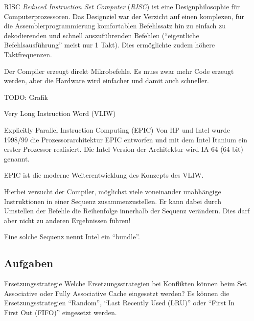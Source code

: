 \begin{defi}[Befehlssatzarchitektur]{RISC}
    \emph{Reduced Instruction Set Computer} (\emph{RISC}) ist eine Designphilosophie für Computerprozessoren.
    Das Designziel war der Verzicht auf einen komplexen, für die Assemblerprogrammierung komfortablen Befehlssatz hin zu einfach zu dekodierenden und schnell auszuführenden Befehlen (\enquote{eigentliche Befehlsausführung} meist nur 1 Takt).
    Dies ermöglichte zudem höhere Taktfrequenzen.

    Der Compiler erzeugt direkt Mikrobefehle.
    Es muss zwar mehr Code erzeugt werden, aber die Hardware wird einfacher und damit auch schneller.

    TODO: Grafik
    \begin{defi}{Very Long Instruction Word (VLIW)}
    \end{defi}

    \begin{defi}{Explicitly Parallel Instruction Computing (EPIC)}
        Von HP und Intel wurde 1998/99 die Prozessorarchitektur EPIC entworfen
        und mit dem Intel Itanium ein erster Prozessor realisiert.
        Die Intel-Version der Architektur wird IA-64 (64 bit) genannt.

        EPIC ist die moderne Weiterentwicklung des Konzepts des VLIW.

        Hierbei versucht der Compiler,
        möglichst viele voneinander unabhängige Instruktionen in einer Sequenz zusammenzustellen.
        Er kann dabei durch Umstellen der Befehle die Reihenfolge innerhalb der Sequenz verändern.
        Dies darf aber nicht zu anderen Ergebnissen führen!

        Eine solche Sequenz nennt Intel ein \enquote{bundle}.
    \end{defi}

    \subsection{Aufgaben}

    \begin{aufgabe}[Caches]{Ersetzungsstrategie}
        Welche Ersetzungsstrategien bei Konflikten können beim Set Associative oder Fully Associative Cache eingesetzt werden?
        \tcblower
        Es können die Ersetzungsstrategien \enquote{Random},
        \enquote{Last Recently Used (LRU)} oder \enquote{First In First Out (FIFO)} eingesetzt werden.
    \end{aufgabe}


\end{defi}
